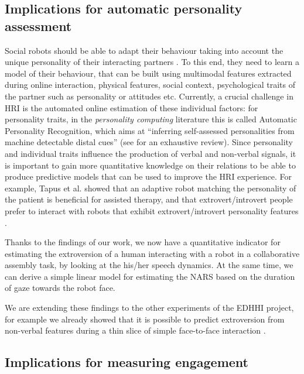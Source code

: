 \documentclass[twocolumn]{svjour3}          %
\newcommand{\todo}[1]{\color{red} { \bf TODO: #1 } \normalcolor}
\begin{document}
\subsection{Implications for automatic personality assessment}


Social robots should be able to adapt their behaviour taking into account the unique personality of their interacting partners \cite{Anzalone2012profile}. To this end, they need to learn a model of their behaviour, that can be built using multimodal features extracted during online interaction, physical features, social context, psychological traits of the partner such as personality or attitudes etc.
Currently, a crucial challenge in HRI is the automated online estimation of these individual factors: for personality traits, in the \emph{personality computing} literature this is called Automatic Personality Recognition, which aims at ``inferring self-assessed personalities from machine detectable distal cues'' (see \cite{Vinciarelli14} for an exhaustive review).  
Since personality and individual traits influence the production of verbal and non-verbal signals, it is important to gain more quantitative knowledge on their relations to be able to produce predictive models that can be used to improve the HRI experience.
For example, Tapus et al. \cite{Tapus08,Tapus08b} showed that an adaptive robot matching the personality of the patient is beneficial for assisted therapy, and that extrovert/introvert people prefer to interact with robots that exhibit extrovert/introvert personality features \cite{Aly2013personality}. 

Thanks to the findings of our work, we now have a quantitative indicator for estimating the extroversion of a human interacting with a robot in a collaborative assembly task, by looking at the his/her speech dynamics. At the same time, we can derive a simple linear model for estimating the NARS based on the duration of gaze towards the robot face. 

We are extending these findings to the other experiments of the EDHHI project, for example we already showed that it is possible to predict extroversion from non-verbal features during a thin slice of simple face-to-face interaction \cite{ICSR2015}.




\subsection{Implications for measuring engagement}
\end{document}
